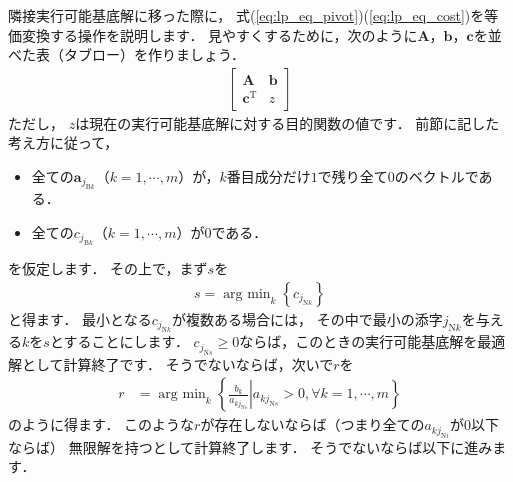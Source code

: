 ﻿\documentclass[a4paper]{jsarticle}
\begin{document}
隣接実行可能基底解に移った際に，
式(\ref{eq:lp_eq_pivot})(\ref{eq:lp_eq_cost})を等価変換する操作を説明します．
見やすくするために，次のように$\boldsymbol{A}$，$\boldsymbol{b}$，$\boldsymbol{c}$を並べた表（タブロー）を作りましょう．
\begin{align*}
\begin{bmatrix}
\boldsymbol{A} & \boldsymbol{b} \\
\boldsymbol{c}^{\mathrm{T}} & z
\end{bmatrix}
\end{align*}
ただし，
$z$は現在の実行可能基底解に対する目的関数の値です．
前節に記した考え方に従って，
\begin{screen}
\begin{itemize}
\item{全ての$\boldsymbol{a}_{j_{\mathrm{B}k}}$（$k=1,\cdots,m$）が，$k$番目成分だけ$1$で残り全て$0$のベクトルである．}
\item{全ての$c_{j_{\mathrm{B}k}}$（$k=1,\cdots,m$）が$0$である．}
\end{itemize}
\end{screen}
を仮定します．
その上で，まず$s$を
\begin{align*}
s=\mathop{\mathrm{arg~min}}_{k}\left\{c_{j_{\mathrm{N}k}}\right\}
\end{align*}
と得ます．
最小となる$c_{j_{\mathrm{N}k}}$が複数ある場合には，
その中で最小の添字$j_{\mathrm{N}k}$を与える$k$を$s$とすることにします．
$c_{j_{\mathrm{N}s}}\geq 0$ならば，このときの実行可能基底解を最適解として計算終了です．
そうでないならば，次いで$r$を
\begin{align*}
r&=\mathop{\mathrm{arg~min}}_{k}\left\{
\left.\frac{b_{k}}{a_{kj_{\mathrm{N}s}}}\right|
a_{kj_{\mathrm{N}s}}>0, \forall k=1,\cdots,m
\right\}
\end{align*}
のように得ます．
このような$r$が存在しないならば（つまり全ての$a_{kj_{\mathrm{N}i}}$が$0$以下ならば）
無限解を持つとして計算終了します．
そうでないならば以下に進みます．
\end{document}
